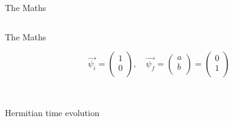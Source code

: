 \documentclass[10pt]{beamer}
\begin{document}
\begin{frame}{The Maths}
\begin{columns}
\begin{column}{0.5\textwidth}
\begin{scriptsize}
    \end{scriptsize}
    \end{column}
\end{columns}
\end{frame}


\begin{frame}{The Maths}
\begin{scriptsize}
\begin{equation*}
    \vec{\psi_{i}}  = \begin{pmatrix}
                        1 \\
                        0 \\                
    \end{pmatrix}, \quad
    \vec{\psi_{f}}  = \begin{pmatrix}
                        a \\
                        b \\                
    \end{pmatrix}
    = \begin{pmatrix}
                        0 \\
                        1 \\                
    \end{pmatrix}
    \end{equation*}\\
    \end{scriptsize}
    \vspace{0.3cm}

    \begin{columns}
    \begin{column}{0.5\textwidth}
    \textcolor{myNewColorA}{Hermitian} time evolution\\


\end{column}
\end{columns}
\end{frame}
\end{document}
